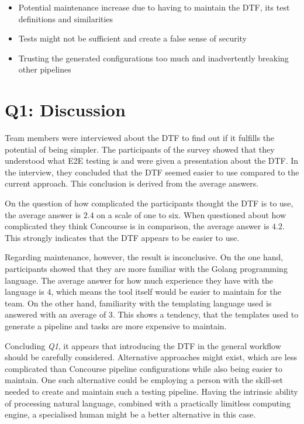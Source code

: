 \begin{itemize}
    \item Potential maintenance increase due to having to maintain the DTF, its test definitions and similarities
    \item Tests might not be sufficient and create a false sense of security
    \item Trusting the generated configurations too much and inadvertently breaking other pipelines
\end{itemize}

\section{Q1: Discussion}\label{sec:q1:-discussion}

Team members were interviewed about the DTF to find out if it fulfills the potential of being simpler.
The participants of the survey showed that they understood what E2E testing is and were given a presentation about the DTF.
In the interview, they concluded that the DTF seemed easier to use compared to the current approach.
This conclusion is derived from the average answers.

On the question of how complicated the participants thought the DTF is to use, the average answer is $2.4$ on a scale of one to six.
When questioned about how complicated they think Concourse is in comparison, the average answer is $4.2$.
This strongly indicates that the DTF appears to be easier to use.

Regarding maintenance, however, the result is inconclusive.
On the one hand, participants showed that they are more familiar with the Golang programming language.
The average answer for how much experience they have with the language is $4$, which means the tool itself would be easier to maintain for the team.
On the other hand, familiarity with the templating language used is answered with an average of $3$.
This shows a tendency, that the templates used to generate a pipeline and tasks are more expensive to maintain.

Concluding \textit{Q1}, it appears that introducing the DTF in the general workflow should be carefully considered.
Alternative approaches might exist, which are less complicated than Concourse pipeline configurations while also being easier to maintain.
One such alternative could be employing a person with the skill-set needed to create and maintain such a testing pipeline.
Having the intrinsic ability of processing natural language, combined with a practically limitless computing engine, a specialised human might be a better alternative in this case.

